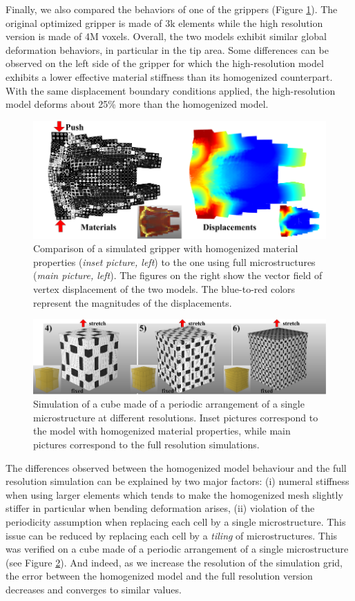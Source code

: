 Finally, we also compared the behaviors of one of the grippers (Figure \ref{fig:gripper_validate}). The original optimized gripper is made of 3k elements while the high resolution version is made of 4M voxels.
Overall, the two models exhibit similar global deformation behaviors, in particular in the tip area. Some differences can be observed on the left side of the gripper for which the high-resolution model exhibits a lower effective material stiffness than its homogenized counterpart. With the same displacement boundary conditions applied, the high-resolution model deforms about 25\% more than the homogenized model.
	
	\begin{figure}[t]
		\centering
		\includegraphics[width=.6\linewidth]{images/gripper_cmp.png}	
		\caption{Comparison of a simulated gripper with homogenized material properties (\emph{inset picture, left}) to the one using full microstructures (\emph{main picture, left}). The figures on the right show the vector field of vertex displacement of the two models. The blue-to-red colors represent the magnitudes of the displacements.}
			\label{fig:gripper_validate}
	\end{figure}
	
	\begin{figure}[h]
		\centering
		\includegraphics[width=.8\linewidth]{images/hom_cube_peri.png}	
		\caption{Simulation of a cube made of a periodic arrangement of a single microstructure at different resolutions. Inset pictures correspond to the model with homogenized material properties, while main pictures correspond to the full resolution simulations.}
			\label{fig:hom_cube_1}
	\end{figure}
	
The differences observed between the homogenized model behaviour and the full resolution simulation can be explained by two major factors: (i) numeral stiffness when using larger elements which tends to make the homogenized mesh slightly stiffer in particular when bending deformation arises, (ii) violation of the periodicity assumption when replacing each cell by a single microstructure. This issue can be reduced by replacing each cell by a {\it tiling} of microstructures. This was verified on a cube made of a periodic arrangement of a single microstructure (see Figure \ref{fig:hom_cube_1}). And indeed, as we increase the resolution of the simulation grid, the error between the homogenized model and the full resolution version decreases and converges to similar values.

